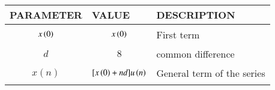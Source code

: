 \begin{tabular}{|p{2cm}|p{2.5cm}|p{2.3cm}|}
    \hline
    PARAMETER & VALUE & DESCRIPTION  \\ \hline
    $$x\left(0\right)$$ & $$x\left(0\right)$$ & First term \\ \hline
    $$d$$ & $$8$$ & common difference \\ \hline
    $$x(n)$$ & $$[x\left(0\right)+nd]u\left(n\right)$$ & General term of the series  \\ \hline
\end{tabular}

